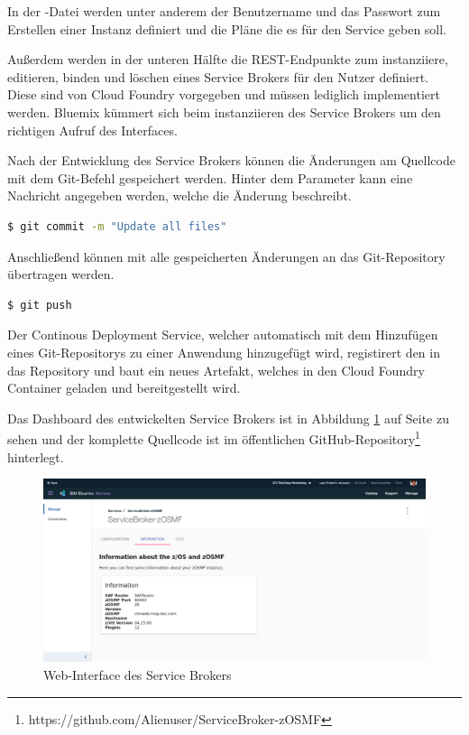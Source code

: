 In der -Datei werden unter anderem der Benutzername und das Passwort zum Erstellen einer Instanz definiert
und die Pläne die es für den Service geben soll.

Außerdem werden in der unteren Hälfte die REST-Endpunkte zum instanziiere, editieren, binden und löschen eines Service
Brokers für den Nutzer definiert. Diese sind von Cloud Foundry vorgegeben und müssen lediglich implementiert werden.
Bluemix kümmert sich beim instanziieren des Service Brokers um den richtigen Aufruf des Interfaces.

Nach der Entwicklung des Service Brokers können die Änderungen am Quellcode mit dem Git-Befehl  gespeichert
werden. Hinter dem Parameter  kann eine Nachricht angegeben werden, welche die Änderung beschreibt.

\begin{lstlisting}[language=bash, caption=Änderungen speichern, label=Änderungen speichern]
   $ git commit -m "Update all files"
\end{lstlisting}

Anschließend können mit  alle gespeicherten Änderungen an das Git-Repository übertragen werden.

\begin{lstlisting}[language=bash, caption=Änderungen hochladen, label=Änderungen hochladen]
   $ git push
\end{lstlisting}

Der Continous Deployment Service, welcher automatisch mit dem Hinzufügen eines Git-Repositorys zu einer Anwendung
hinzugefügt wird, registirert den  in das Repository und baut ein neues Artefakt, welches in den Cloud Foundry
Container geladen und bereitgestellt wird.

Das Dashboard des entwickelten Service Brokers ist in Abbildung \ref{fig:servicebroker_oberflaeche} auf Seite
\pageref{fig:servicebroker_oberflaeche} zu sehen und der komplette Quellcode ist im öffentlichen
GitHub-\-Repository\footnote{https://github.com/Alienuser/ServiceBroker-zOSMF} hinterlegt.

\begin{figure}[h]
  \centering
    \includegraphics[scale=0.31]{images/kapitel_3/servicebroker_oberflaeche.pdf}
  \caption{Web-Interface des Service Brokers}
  \label{fig:servicebroker_oberflaeche}
\end{figure}

